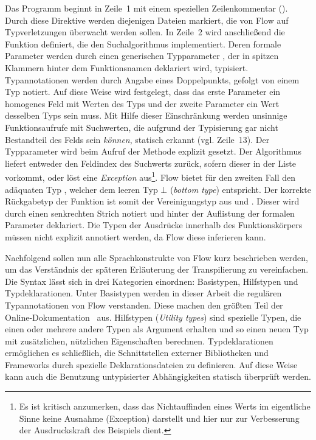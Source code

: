 Das Programm beginnt in Zeile~1 mit einem speziellen Zeilenkommentar (). Durch diese Direktive werden diejenigen Dateien markiert, die von Flow auf Typverletzungen überwacht werden sollen. In Zeile~2 wird anschließend die Funktion  definiert, die den Suchalgorithmus implementiert. Deren formale Parameter werden durch einen generischen Typparameter , der in spitzen Klammern hinter dem Funktionsnamen deklariert wird, typisiert. Typannotationen werden durch Angabe eines Doppelpunkts, gefolgt von einem Typ notiert. Auf diese Weise wird festgelegt, dass das erste Parameter  ein homogenes Feld mit Werten des Typs  und der zweite Parameter  ein Wert desselben Typs sein muss. Mit Hilfe dieser Einschränkung werden unsinnige Funktionsaufrufe mit Suchwerten, die aufgrund der Typisierung gar nicht Bestandteil des Felds sein \emph{können}, statisch erkannt (vgl. Zeile~13). Der Typparameter  wird beim Aufruf der Methode explizit gesetzt.
Der Algorithmus liefert entweder den Feldindex des Suchwerts zurück, sofern dieser in der Liste vorkommt, oder löst eine \textit{Exception} aus\footnote{Es ist kritisch anzumerken, dass das Nichtauffinden eines Werts im eigentliche Sinne keine Ausnahme (Exception) darstellt und hier nur zur Verbesserung der Ausdruckskraft des Beispiels dient.}. Flow bietet für den zweiten Fall den adäquaten Typ , welcher dem leeren Typ $\bot$ (\textit{bottom type}) entspricht. Der korrekte Rückgabetyp der Funktion ist somit der Vereinigungstyp aus  und . Dieser wird durch einen senkrechten Strich notiert und hinter der Auflistung der formalen Parameter deklariert. Die Typen der Ausdrücke innerhalb des Funktionskörpers müssen nicht explizit annotiert werden, da Flow diese inferieren kann.

Nachfolgend sollen nun alle Sprachkonstrukte von Flow kurz beschrieben werden, um das Verständnis der späteren Erläuterung der Transpilierung zu vereinfachen. Die Syntax lässt sich in drei Kategorien einordnen: Basistypen, Hilfstypen und Typdeklarationen.
Unter Basistypen werden in dieser Arbeit die regulären Typannotationen von Flow verstanden. Diese machen den größten Teil der Online-Dokumentation~\autocite{FLOW:TYPE_ANNOTATIONS} aus.
Hilfstypen (\textit{Utility types}) sind spezielle Typen, die einen oder mehrere andere Typen als Argument erhalten und so einen neuen Typ mit zusätzlichen, nützlichen Eigenschaften berechnen.
Typdeklarationen ermöglichen es schließlich, die Schnittstellen externer Bibliotheken und Frameworks durch spezielle Deklarationsdateien zu definieren. Auf diese Weise kann auch die Benutzung untypisierter Abhängigkeiten statisch überprüft werden.


